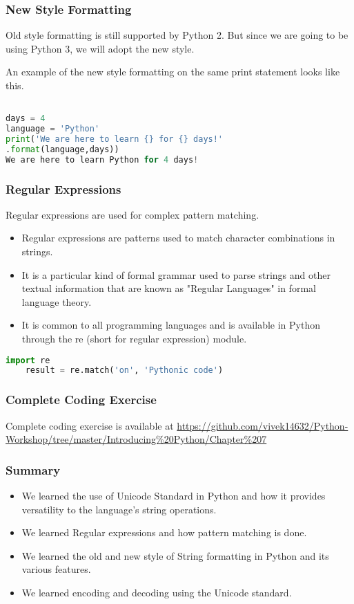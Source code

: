 \documentclass{beamer}
\begin{document}
\begin{frame}[fragile]
\frametitle{New Style Formatting}
Old style formatting is still supported by Python 2. But since we are going to be using Python 3, we will adopt the new style.


An example of the new style formatting on the same print statement looks like this.
\begin{lstlisting}[language=Python]

days = 4
language = 'Python'
print('We are here to learn {} for {} days!'
.format(language,days))
We are here to learn Python for 4 days!
\end{lstlisting}
\end{frame}

\begin{frame}[fragile]
\frametitle{Regular Expressions}
Regular expressions are used for complex pattern matching.
\begin{itemize}
\item Regular expressions are patterns used to match character combinations in strings.
\item It is a particular kind of formal grammar used to parse strings and other textual information that are known as "Regular Languages" in formal language theory.
\item It is common to all programming languages and is available in Python through the re (short for regular expression) module.
\end{itemize}
\begin{lstlisting}[language=Python]
	import re
	result = re.match('on', 'Pythonic code')
\end{lstlisting}
\end{frame}

\begin{frame}
\frametitle{Complete Coding Exercise}
Complete coding exercise is available at \url{https://github.com/vivek14632/Python-Workshop/tree/master/Introducing\%20Python/Chapter\%207}
\end{frame}

\begin{frame}
\frametitle{Summary}
\begin{itemize}
\item We learned the use of Unicode Standard in Python and how it provides versatility to the language's string operations.
\item We learned Regular expressions and how pattern matching is done.
\item We learned the old and new style of String formatting in Python and its various features.
\item We learned encoding and decoding using the Unicode standard. 
\end{itemize}
\end{frame}
\end{document}
